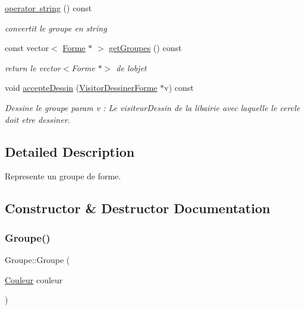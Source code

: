 \begin{DoxyCompactItemize}
\mbox{\hyperlink{class_groupe_ab8bcab328da985da9907cffe76ca71d0}{operator string}} () const
\begin{DoxyCompactList}\small\item\em convertit le groupe en string \end{DoxyCompactList}\item 
\mbox{\label{class_groupe_a79118af624ecc7913bc83b320b6facd8}} 
const vector$<$ \mbox{\hyperlink{class_forme}{Forme}} $\ast$ $>$ \mbox{\hyperlink{class_groupe_a79118af624ecc7913bc83b320b6facd8}{get\+Groupes}} () const
\begin{DoxyCompactList}\small\item\em return le vector$<$\+Forme $\ast$$>$ de l\textquotesingle{}objet \end{DoxyCompactList}\item 
\mbox{\label{class_groupe_a1e2c361f1218dbdee98cd4629085b755}} 
void \mbox{\hyperlink{class_groupe_a1e2c361f1218dbdee98cd4629085b755}{accepte\+Dessin}} (\mbox{\hyperlink{class_visitor_dessiner_forme}{Visitor\+Dessiner\+Forme}} $\ast$v) const
\begin{DoxyCompactList}\small\item\em Dessine le groupe param v \+: Le visiteur\+Dessin de la libairie avec laquelle le cercle doit etre dessiner. \end{DoxyCompactList}\end{DoxyCompactItemize}


\subsection{Detailed Description}
Represente un groupe de forme. 

\subsection{Constructor \& Destructor Documentation}
\mbox{\label{class_groupe_adb2191a0bf07c68fd86f0ee36b4cec8d}} 
\subsubsection{\texorpdfstring{Groupe()}{Groupe()}\hspace{0.1cm}{\footnotesize\ttfamily [1/2]}}
{\footnotesize\ttfamily Groupe\+::\+Groupe (\begin{DoxyParamCaption}\item[{\mbox{\hyperlink{class_couleur}{Couleur}}}]{couleur }\end{DoxyParamCaption})\hspace{0.3cm}{\ttfamily [inline]}}



